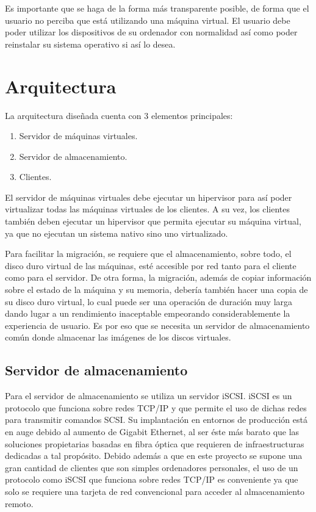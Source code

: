 \documentclass[spanisheDIVcalc,twoside,parskip-,pointlessnumbers,final]{scrbook}
\begin{document}
Es importante que se haga de la forma más transparente posible, de
forma que el usuario no perciba que está utilizando una máquina virtual.
El usuario debe poder utilizar los dispositivos de su ordenador con
normalidad así como poder reinstalar su sistema operativo si así lo
desea.


\section{Arquitectura}

La arquitectura diseñada cuenta con 3 elementos principales:
\begin{enumerate}
\item Servidor de máquinas virtuales.
\item Servidor de almacenamiento.
\item Clientes.
\end{enumerate}
El servidor de máquinas virtuales debe ejecutar un hipervisor para
así poder virtualizar todas las máquinas virtuales de los clientes.
A su vez, los clientes también deben ejecutar un hipervisor que permita
ejecutar su máquina virtual, ya que no ejecutan un sistema nativo
sino uno virtualizado.

Para facilitar la migración, se requiere que el almacenamiento, sobre
todo, el disco duro virtual de las máquinas, esté accesible por red
tanto para el cliente como para el servidor. De otra forma, la migración,
además de copiar información sobre el estado de la máquina y su memoria,
debería también hacer una copia de su disco duro virtual, lo cual
puede ser una operación de duración muy larga dando lugar a un rendimiento
inaceptable empeorando considerablemente la experiencia de usuario.
Es por eso que se necesita un servidor de almacenamiento común donde
almacenar las imágenes de los discos virtuales.


\subsection{Servidor de almacenamiento}

Para el servidor de almacenamiento se utiliza un servidor iSCSI. iSCSI
es un protocolo que funciona sobre redes TCP/IP y que permite el uso
de dichas redes para transmitir comandos SCSI. Su implantación en
entornos de producción está en auge debido al aumento de Gigabit Ethernet,
al ser éste más barato que las soluciones propietarias basadas en fibra óptica
que requieren de infraestructuras dedicadas a tal propósito. Debido
además a que en este proyecto se supone una gran cantidad de clientes
que son simples ordenadores personales, el uso de un protocolo como
iSCSI que funciona sobre redes TCP/IP es conveniente ya que solo se
requiere una tarjeta de red convencional para acceder al almacenamiento
remoto. 
\end{document}

